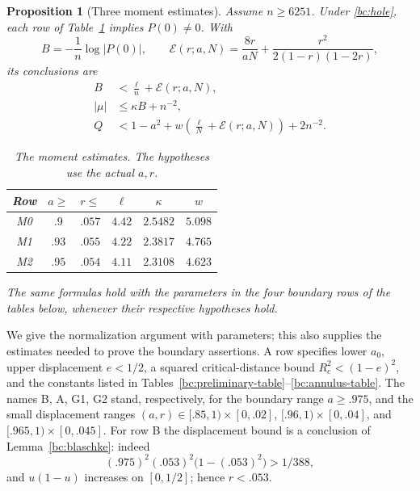 \documentclass[11pt,reqno]{amsart}
\numberwithin{equation}{section}
\newtheorem{proposition}[theorem]{Proposition}
\theoremstyle{definition}
\theoremstyle{remark}
\begin{document}
\begin{proposition}[Three moment estimates]\label{bc:moment-proposition}
Assume $n\geq6251$.  Under \eqref{bc:hole}, each row of
Table~\ref{bc:moment-conclusions} implies $P(0)\ne0$.  With
\begin{equation}\label{bc:B-and-error}
 B=-\frac1n\log|P(0)|,\qquad
 \mathcal E(r;a,N)=\frac{8r}{aN}
       +\frac{r^2}{2(1-r)(1-2r)},
\end{equation}
its conclusions are
\begin{align}
 B&<\frac\ell n+\mathcal E(r;a,N),                 \label{bc:moment-B}\\
 |\mu|&\leq\kappa B+n^{-2},                       \label{bc:moment-mean}\\
 Q&<1-a^2+w\left(\frac\ell N+\mathcal E(r;a,N)\right)
                   +2n^{-2}.                    \label{bc:moment-Q}
\end{align}
\begin{table}[ht]
\centering
\caption{The moment estimates.  The hypotheses use the actual $a,r$.}
\label{bc:moment-conclusions}
\begin{tabular}{@{}cccccc@{}}\toprule
Row&$a\geq$&$r\leq$&$\ell$&$\kappa$&$w$\\\midrule
M0&$.9$&$.057$&$4.42$&$2.5482$&$5.098$\\
M1&$.93$&$.055$&$4.22$&$2.3817$&$4.765$\\
M2&$.95$&$.054$&$4.11$&$2.3108$&$4.623$\\\bottomrule
\end{tabular}
\end{table}
The same formulas hold with the parameters in the four boundary rows
of the tables below, whenever their respective hypotheses hold.
\end{proposition}

We give the normalization argument with parameters; this also supplies
the estimates needed to prove the boundary assertions.  A row specifies
lower $a_0$, upper displacement $e<1/2$, a squared critical-distance
bound $R_c^2<(1-e)^2$, and the constants listed in
Tables~\ref{bc:preliminary-table}--\ref{bc:annulus-table}.
The names B, A, G1, G2 stand, respectively, for the boundary range
$a\geq.975$, and the small displacement ranges
$(a,r)\in[.85,1)\times[0,.02]$,
$[.96,1)\times[0,.04]$, and
$[.965,1)\times[0,.045]$.
For row B the displacement bound is a conclusion of
Lemma~\ref{bc:blaschke}: indeed
\[
 (.975)^2(.053)^2\bigl(1-(.053)^2\bigr)>1/388,
\]
and $u(1-u)$ increases on $[0,1/2]$; hence $r<.053$.
\end{document}
